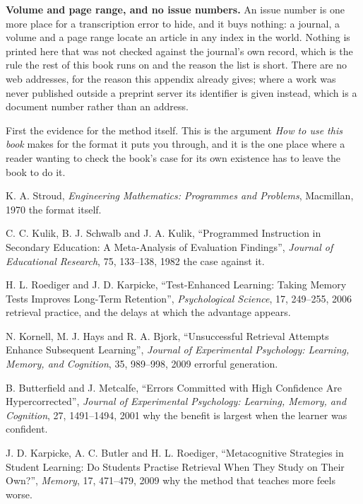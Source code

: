 \begin{note}
\textbf{Volume and page range, and no issue numbers.} An issue number is one
more place for a transcription error to hide, and it buys nothing: a journal, a
volume and a page range locate an article in any index in the world. Nothing is printed here that was not checked
against the journal's own record, which is the rule the rest of this book runs
on and the reason the list is short. There are no web addresses, for the reason
this appendix already gives; where a work was never published outside a
preprint server its identifier is given instead, which is a document number
rather than an address.
\end{note}

\medskip
First the evidence for the method itself. This is the argument \emph{How to use
this book} makes for the format it puts you through, and it is the one place
where a reader wanting to check the book's case for its own existence has to
leave the book to do it.

\begin{reslist}
\item K. A. Stroud, \emph{Engineering Mathematics: Programmes and Problems},
  Macmillan, 1970 \dash{} the format itself.
\item C. C. Kulik, B. J. Schwalb and J. A. Kulik, \enquote{Programmed
  Instruction in Secondary Education: A Meta-Analysis of Evaluation Findings},
  \emph{Journal of Educational Research}, 75, 133--138, 1982 \dash{} the case
  against it.
\item H. L. Roediger and J. D. Karpicke, \enquote{Test-Enhanced Learning:
  Taking Memory Tests Improves Long-Term Retention}, \emph{Psychological
  Science}, 17, 249--255, 2006 \dash{} retrieval practice, and the delays at
  which the advantage appears.
\item N. Kornell, M. J. Hays and R. A. Bjork, \enquote{Unsuccessful Retrieval
  Attempts Enhance Subsequent Learning}, \emph{Journal of Experimental
  Psychology: Learning, Memory, and Cognition}, 35, 989--998, 2009 \dash{}
  errorful generation.
\item B. Butterfield and J. Metcalfe, \enquote{Errors Committed with High
  Confidence Are Hypercorrected}, \emph{Journal of Experimental Psychology:
  Learning, Memory, and Cognition}, 27, 1491--1494, 2001 \dash{} why the
  benefit is largest when the learner was confident.
\item J. D. Karpicke, A. C. Butler and H. L. Roediger, \enquote{Metacognitive
  Strategies in Student Learning: Do Students Practise Retrieval When They
  Study on Their Own?}, \emph{Memory}, 17, 471--479, 2009 \dash{} why the
  method that teaches more feels worse.
\end{reslist}

